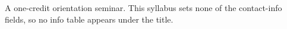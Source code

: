 \documentclass{syllabus}
\begin{document}
\maketitle

A one-credit orientation seminar. This syllabus sets none of the contact-info
fields, so no info table appears under the title.
\end{document}
